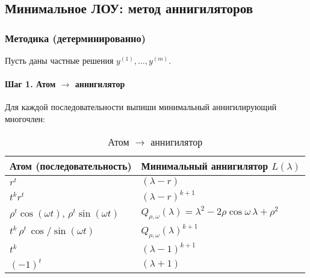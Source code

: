 \subsection{Минимальное ЛОУ: метод аннигиляторов}\label{subsec:min-lre}

\begin{center}
\end{center}

\subsubsection*{Методика (детерминированно)}

Пусть даны частные решения $y^{(1)},\ldots,y^{(m)}$.

\paragraph{Шаг 1. Атом $\to$ аннигилятор}
Для каждой последовательности выпиши минимальный аннигилирующий многочлен:
\begin{table}[h!]
\centering
\caption{Атом $\to$ аннигилятор}
\label{tab:atom-to-annihilator}
\begin{tabular}{|l|l|}
\hline
\textbf{Атом (последовательность)} & \textbf{Минимальный аннигилятор $L(\lambda)$} \\
\hline
$r^t$ & $(\lambda - r)$ \\
\hline
$t^k r^t$ & $(\lambda - r)^{k+1}$ \\
\hline
$\rho^t \cos(\omega t)$, $\rho^t \sin(\omega t)$ & $Q_{\rho,\omega}(\lambda)=\lambda^2-2\rho\cos\omega\,\lambda+\rho^2$ \\
\hline
$t^k \, \rho^t \, \cos/\sin(\omega t)$ & $Q_{\rho,\omega}(\lambda)^{k+1}$ \\
\hline
$t^k$ & $(\lambda-1)^{k+1}$ \\
\hline
$(-1)^t$ & $(\lambda+1)$ \\
\hline
\end{tabular}
\end{table}

